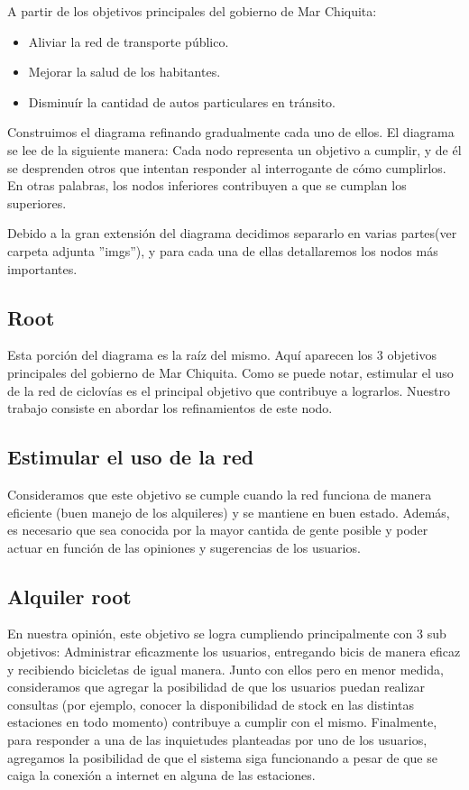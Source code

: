 A partir de los objetivos principales del gobierno de Mar Chiquita:
\begin{itemize}
\item Aliviar la red de transporte público.
\item Mejorar la salud de los habitantes.
\item Disminuír la cantidad de autos particulares en tránsito. 
\end{itemize}

Construimos el diagrama refinando gradualmente cada uno de ellos. El diagrama se lee de la siguiente manera:
Cada nodo representa un objetivo a cumplir, y de él se desprenden otros que intentan responder al interrogante de cómo cumplirlos. En otras palabras, los nodos inferiores contribuyen a que se cumplan los superiores.

Debido a la gran extensión del diagrama decidimos separarlo en varias partes(ver carpeta adjunta ''imgs''), y para cada una de ellas detallaremos los 
nodos más importantes.

\subsection{Root}

Esta porción del diagrama es la raíz del mismo. Aquí aparecen los 3 objetivos principales del gobierno de Mar Chiquita.
Como se puede notar, estimular el uso de la red de ciclovías es el principal objetivo que contribuye a lograrlos.
Nuestro trabajo consiste en abordar los refinamientos de este nodo.

\subsection{Estimular el uso de la red}

Consideramos que este objetivo se cumple cuando la red funciona de manera eficiente (buen manejo de los
alquileres) y se mantiene en buen estado. Además, es necesario que sea conocida por la mayor cantida de gente
posible y poder actuar en función de las opiniones y sugerencias de los usuarios.

\subsection{Alquiler root}

En nuestra opinión, este objetivo se logra cumpliendo principalmente con 3 sub objetivos:
Administrar eficazmente los usuarios, entregando bicis de manera eficaz y recibiendo bicicletas de igual
manera. 
Junto con ellos pero en menor medida, consideramos que agregar la posibilidad de que los usuarios puedan realizar consultas
(por ejemplo, conocer la disponibilidad de stock en las distintas estaciones en todo momento) contribuye a cumplir con el mismo.
Finalmente, para responder a una de las inquietudes planteadas por uno de los usuarios, agregamos la posibilidad de que el 
sistema siga funcionando a pesar de que se caiga la conexión a internet en alguna de las estaciones.

